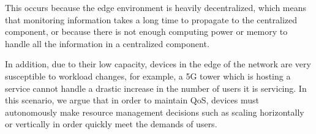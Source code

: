 This occurs because the edge environment is heavily decentralized, which means that monitoring information takes a long time to propagate to the centralized component, or because there is not enough computing power or memory to handle all the information in a centralized component.

In addition, due to their low capacity, devices in the edge of the network are very susceptible to workload changes, for example, a 5G tower which is hosting a service cannot handle a drastic increase in the number of users it is servicing. In this scenario, we argue that in order to maintain QoS, devices must autonomously make resource management decisions such as scaling horizontally or vertically in order quickly meet the demands of users.








